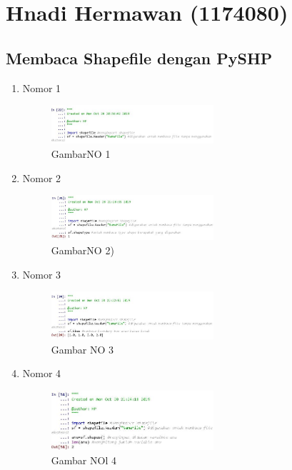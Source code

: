 \section{Hnadi Hermawan (1174080)}
\subsection{Membaca Shapefile dengan PySHP}
\begin{enumerate}
	\item Nomor 1
	
	\begin{figure}[H]
		\includegraphics[width=6cm]{figures/Tugas3/1174080/NO1.JPG}
		\centering
		\caption{GambarNO 1}
	\end{figure}
	\item Nomor 2
	
	\begin{figure}[H]
		\includegraphics[width=6cm]{figures/Tugas3/1174080/NO2.JPG}
		\centering
		\caption{GambarNO 2)}
	\end{figure}
	\item Nomor 3
	
	\begin{figure}[H]
		\includegraphics[width=6cm]{figures/Tugas3/1174080/NO3.JPG}
		\centering
		\caption{Gambar NO 3}
	\end{figure}
	\item Nomor 4
	
	\begin{figure}[H]
		\includegraphics[width=6cm]{figures/Tugas3/1174080/NO4.JPG}
		\centering
		\caption{Gambar NOl 4}
	\end{figure}

\end{enumerate}
